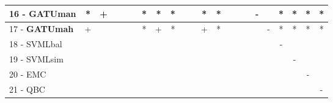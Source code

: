 \begin{table}[h]
\begin{center}
\begin{tabular}{lcc|cc|cc|cc|cc|cc|cc|cc|cc|cc|c}
16 - \textbf{GATUman}	& * & + &   &   &   & * & * & * &   &   & * & * &   &   &   & - &   & * & * & * & * \\ \hline
17 - \textbf{GATUmah}	& + &   &   &   &   & * & + & * &   &   & + & * &   &   &   &   & - & * & * & * & * \\
18 - SVMLbal	&   &   &   &   &   &   &   &   &   &   &   &   &   &   &   &   &   & - &   &   &   \\ \hline
19 - SVMLsim	&   &   &   &   &   &   &   &   &   &   &   &   &   &   &   &   &   &   & - &   &   \\
20 - EMC  	&   &   &   &   &   &   &   &   &   &   &   &   &   &   &   &   &   &   &   & - &   \\ \hline
21 - QBC  	&   &   &   &   &   &   &   &   &   &   &   &   &   &   &   &   &   &   &   &   & - \\\end{tabular}
\label{stratsALCKappaFried5NNaRedux}
\end{center}
\end{table}